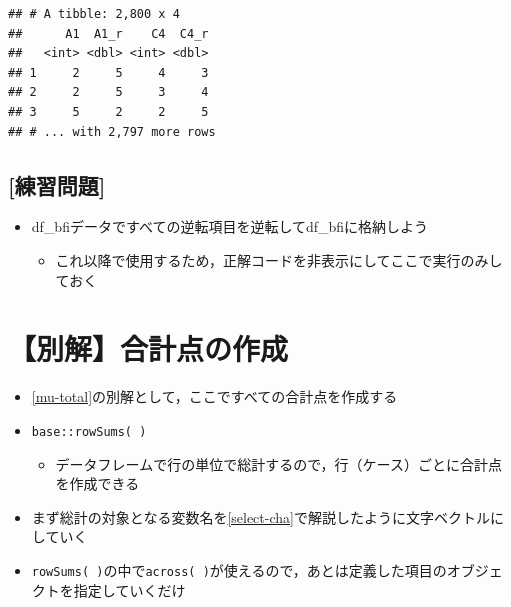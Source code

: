 \documentclass[
  xelatex,ja=standard, b5paper]{bxjsbook}
\providecommand{\tightlist}{%
  \setlength{\itemsep}{0pt}\setlength{\parskip}{0pt}}
\begin{document}
\begin{verbatim}
## # A tibble: 2,800 x 4
##      A1  A1_r    C4  C4_r
##   <int> <dbl> <int> <dbl>
## 1     2     5     4     3
## 2     2     5     3     4
## 3     5     2     2     5
## # ... with 2,797 more rows
\end{verbatim}

\hypertarget{ux7df4ux7fd2ux554fux984c-13}{%
\subsection{{[}練習問題{]}}\label{ux7df4ux7fd2ux554fux984c-13}}

\begin{itemize}
\tightlist
\item
  df\_bfiデータですべての逆転項目を逆転してdf\_bfiに格納しよう

  \begin{itemize}
  \tightlist
  \item
    これ以降で使用するため，正解コードを非表示にしてここで実行のみしておく
  \end{itemize}
\end{itemize}

\hypertarget{mu-total-ef}{%
\section{【別解】合計点の作成}\label{mu-total-ef}}

\begin{itemize}
\tightlist
\item
  \ref{mu-total}の別解として，ここですべての合計点を作成する
\item
  \texttt{base::rowSums(\ )}

  \begin{itemize}
  \tightlist
  \item
    データフレームで行の単位で総計するので，行（ケース）ごとに合計点を作成できる
  \end{itemize}
\item
  まず総計の対象となる変数名を\ref{select-cha}で解説したように文字ベクトルにしていく
\item
  \texttt{rowSums(\ )}の中で\texttt{across(\ )}が使えるので，あとは定義した項目のオブジェクトを指定していくだけ
\end{itemize}
\end{document}
